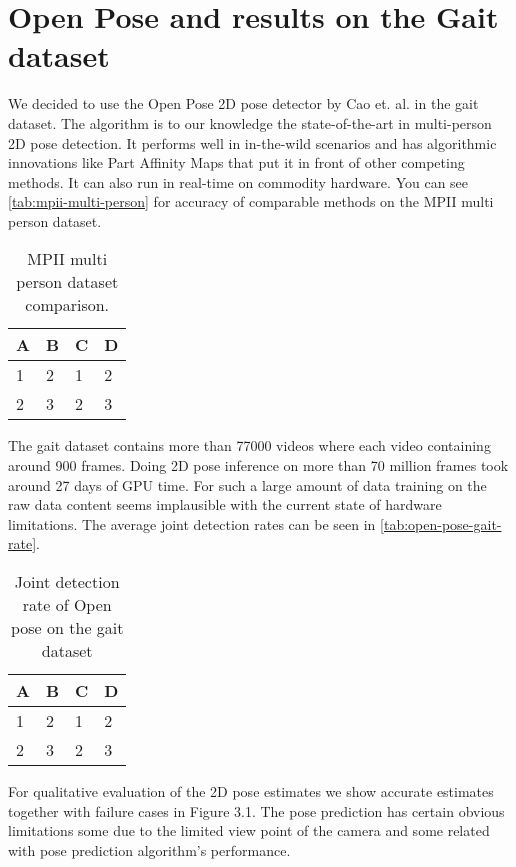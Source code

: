 \section{Open Pose and results on the Gait dataset}

We decided to use the Open Pose 2D pose detector by Cao et. al. \parencite{cao2016realtime} in the gait dataset. The algorithm is to our knowledge the state-of-the-art in multi-person 2D pose detection. It performs well in in-the-wild scenarios and has algorithmic innovations like Part Affinity Maps that put it in front of other competing methods. It can also run in real-time on commodity hardware. You can see \autoref{tab:mpii-multi-person} for accuracy of comparable methods on the MPII multi person dataset.

\begin{table}[htpb]
    \centering
    \begin{tabular}{l l l l}
      \toprule
        A & B & C & D \\
      \midrule
        1 & 2 & 1 & 2 \\
        2 & 3 & 2 & 3 \\
      \bottomrule
    \end{tabular}
    \caption[2D Pose Comparison]{MPII multi person dataset comparison.}\label{tab:mpii-multi-person}
  \end{table}

The gait dataset contains more than 77000 videos where each video containing around 900 frames. Doing 2D pose inference on more than 70 million frames took around 27 days of GPU time. For such a large amount of data training on the raw data content seems implausible with the current state of hardware limitations. The average joint detection rates can be seen in \autoref{tab:open-pose-gait-rate}.

\begin{table}[htpb]
    \centering
    \begin{tabular}{l l l l}
        \toprule
            A & B & C & D \\
        \midrule
            1 & 2 & 1 & 2 \\
            2 & 3 & 2 & 3 \\
        \bottomrule
    \end{tabular}
    \caption[Joint detection rate]{Joint detection rate of Open pose \parencite{cao2016realtime} on the gait dataset}\label{tab:open-pose-gait-rate}
\end{table}

For qualitative evaluation of the 2D pose estimates we show accurate estimates together with failure cases in Figure 3.1. The pose prediction has certain obvious limitations some due to the limited view point of the camera and some related with pose prediction algorithm's performance. 

